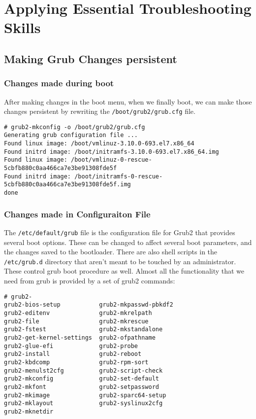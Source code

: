\chapter{Applying Essential Troubleshooting Skills}

\section{Making Grub Changes persistent}
\subsection{Changes made during boot}
After making changes in the boot menu, when we finally boot, we can make those changes persistent by rewriting the \verb|/boot/grub2/grub.cfg| file. 

\vspace{-15pt}
\begin{verbatim}
# grub2-mkconfig -o /boot/grub2/grub.cfg
Generating grub configuration file ...
Found linux image: /boot/vmlinuz-3.10.0-693.el7.x86_64
Found initrd image: /boot/initramfs-3.10.0-693.el7.x86_64.img
Found linux image: /boot/vmlinuz-0-rescue-5cbfb880c0aa466ca7e3be91308fde5f
Found initrd image: /boot/initramfs-0-rescue-5cbfb880c0aa466ca7e3be91308fde5f.img
done
\end{verbatim}
\vspace{-10pt}

\subsection{Changes made in Configuraiton File}
The \verb|/etc/default/grub| file is the configuration file for Grub2 that provides several boot options. These can be changed to affect several boot parameters, and the changes saved to the bootloader. There are also shell scripts in the \verb|/etc/grub.d| directory that aren't meant to be touched by an administrator. These control grub boot procedure as well. Almost all the functionality that we need from grub is provided by a set of grub2 commands:

\vspace{-15pt}
\begin{verbatim}
# grub2-
grub2-bios-setup           grub2-mkpasswd-pbkdf2
grub2-editenv              grub2-mkrelpath
grub2-file                 grub2-mkrescue
grub2-fstest               grub2-mkstandalone
grub2-get-kernel-settings  grub2-ofpathname
grub2-glue-efi             grub2-probe
grub2-install              grub2-reboot
grub2-kbdcomp              grub2-rpm-sort
grub2-menulst2cfg          grub2-script-check
grub2-mkconfig             grub2-set-default
grub2-mkfont               grub2-setpassword
grub2-mkimage              grub2-sparc64-setup
grub2-mklayout             grub2-syslinux2cfg
grub2-mknetdir             
\end{verbatim}
\vspace{-10pt}

